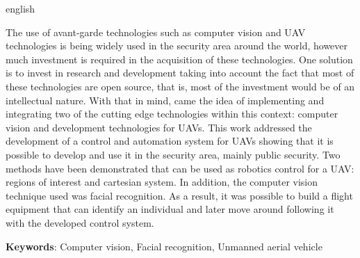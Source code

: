 \begin{resumo}[Abstract]
 \begin{otherlanguage*}{english}
   
   The use of avant-garde technologies such as computer vision and UAV technologies is being widely used in the security area around the world, however much investment is required in the acquisition of these technologies. One solution is to invest in research and development taking into account the fact that most of these technologies are open source, that is, most of the investment would be of an intellectual nature. With that in mind, came the idea of implementing and integrating two of the cutting edge technologies within this context: computer vision and development technologies for UAVs. This work addressed the development of a control and automation system for UAVs showing that it is possible to develop and use it in the security area, mainly public security. Two methods have been demonstrated that can be used as robotics control for a UAV: regions of interest and cartesian system. In addition, the computer vision technique used was facial recognition. As a result, it was possible to build a flight equipment that can identify an individual and later move around following it with the developed control system.

   \vspace{\onelineskip}
 
   \noindent 
   \textbf{Keywords}: Computer vision, Facial recognition, Unmanned aerial vehicle
 \end{otherlanguage*}
\end{resumo}